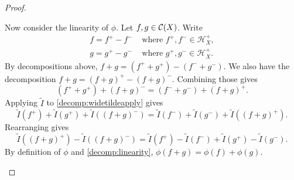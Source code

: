 \begin{proof}
\begin{step}[Generalization to $\C(X)$]
Now consider the linearity of $\phi$. Let $f, g \in {\mathcal C}(X)$. Write
\begin{align*}
    f = f^+ - f^- & \text{ where } f^+, f^- \in \mathcal{H}_{X}^+, \\
    g = g^+ - g^- & \text{ where } g^+, g^- \in \mathcal{H}_{X}^+.
\end{align*}
By decompositions above, $f + g = (f^+ + g^+) - (f^- + g^-)$.
We also have the decomposition $f + g = (f+g)^+ - (f+g)^-$. Combining those gives
\begin{equation}
    \label{decomp:widetildeapply}
    (f^+ + g^+) + (f+g)^- = (f^- + g^-) + (f+g)^+.
\end{equation}
Applying $\widetilde{I}$ to \ref{decomp:widetildeapply} gives 
\begin{equation*}
   \widetilde{I}(f^+) + \widetilde{I}(g^+) + \widetilde{I}((f+g)^-) = \widetilde{I}(f^-) + \widetilde{I}(g^-) + \widetilde{I}((f+g)^+).
\end{equation*}
Rearranging gives
\begin{equation}
\label{decomp:linearity}
\widetilde{I}((f+g)^+) - \widetilde{I}((f+g)^-) =  \widetilde{I}(f^+) - \widetilde{I}(f^-) + \widetilde{I}(g^+) -  \widetilde{I}(g^-).
\end{equation}
By definition of $\phi$ and \ref{decomp:linearity}, $\phi(f + g) = \phi(f) + \phi(g)$.


\end{step}
\end{proof}
